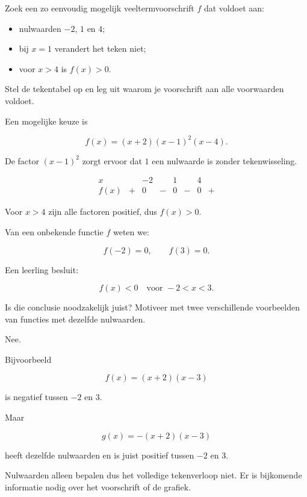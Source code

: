 \documentclass{ximera}
\begin{document}
\begin{oefening}{\oefG}

Zoek een zo eenvoudig mogelijk veeltermvoorschrift \(f\) dat voldoet aan:

\begin{itemize}
    \item nulwaarden \(-2\), \(1\) en \(4\);
    \item bij \(x=1\) verandert het teken niet;
    \item voor \(x>4\) is \(f(x)>0\).
\end{itemize}

Stel de tekentabel op en leg uit waarom je voorschrift aan alle
voorwaarden voldoet.

\begin{oplossing}
Een mogelijke keuze is

\[
f(x)=(x+2)(x-1)^2(x-4).
\]

De factor \((x-1)^2\) zorgt ervoor dat \(1\) een nulwaarde is
zonder tekenwisseling.

\[
\begin{array}{c|ccccccc}
x &  & -2 &  & 1 &  & 4 & \\
\hline
f(x)&+&0&-&0&-&0&+
\end{array}
\]

Voor \(x>4\) zijn alle factoren positief, dus \(f(x)>0\).
\end{oplossing}

\end{oefening}


\begin{oefening}{\oefG}

Van een onbekende functie \(f\) weten we:

\[
f(-2)=0,\qquad f(3)=0.
\]

Een leerling besluit:

\[
f(x)<0\quad\text{voor }-2<x<3.
\]

Is die conclusie noodzakelijk juist?
Motiveer met twee verschillende voorbeelden van functies met
dezelfde nulwaarden.

\begin{oplossing}
Nee.

Bijvoorbeeld

\[
f(x)=(x+2)(x-3)
\]

is negatief tussen \(-2\) en \(3\).

Maar

\[
g(x)=-(x+2)(x-3)
\]

heeft dezelfde nulwaarden en is juist positief tussen \(-2\) en \(3\).

Nulwaarden alleen bepalen dus het volledige tekenverloop niet.
Er is bijkomende informatie nodig over het voorschrift of de grafiek.
\end{oplossing}

\end{oefening}
\end{document}
